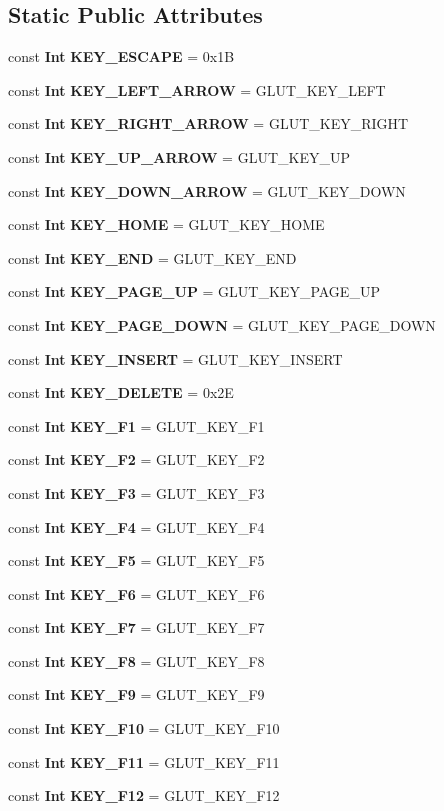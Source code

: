 \subsection*{Static Public Attributes}
\begin{CompactItemize}
\item 
const {\bf Int} {\bf KEY\_\-ESCAPE} = 0x1B
\item 
const {\bf Int} {\bf KEY\_\-LEFT\_\-ARROW} = GLUT\_\-KEY\_\-LEFT
\item 
const {\bf Int} {\bf KEY\_\-RIGHT\_\-ARROW} = GLUT\_\-KEY\_\-RIGHT
\item 
const {\bf Int} {\bf KEY\_\-UP\_\-ARROW} = GLUT\_\-KEY\_\-UP
\item 
const {\bf Int} {\bf KEY\_\-DOWN\_\-ARROW} = GLUT\_\-KEY\_\-DOWN
\item 
const {\bf Int} {\bf KEY\_\-HOME} = GLUT\_\-KEY\_\-HOME
\item 
const {\bf Int} {\bf KEY\_\-END} = GLUT\_\-KEY\_\-END
\item 
const {\bf Int} {\bf KEY\_\-PAGE\_\-UP} = GLUT\_\-KEY\_\-PAGE\_\-UP
\item 
const {\bf Int} {\bf KEY\_\-PAGE\_\-DOWN} = GLUT\_\-KEY\_\-PAGE\_\-DOWN
\item 
const {\bf Int} {\bf KEY\_\-INSERT} = GLUT\_\-KEY\_\-INSERT
\item 
const {\bf Int} {\bf KEY\_\-DELETE} = 0x2E
\item 
const {\bf Int} {\bf KEY\_\-F1} = GLUT\_\-KEY\_\-F1
\item 
const {\bf Int} {\bf KEY\_\-F2} = GLUT\_\-KEY\_\-F2
\item 
const {\bf Int} {\bf KEY\_\-F3} = GLUT\_\-KEY\_\-F3
\item 
const {\bf Int} {\bf KEY\_\-F4} = GLUT\_\-KEY\_\-F4
\item 
const {\bf Int} {\bf KEY\_\-F5} = GLUT\_\-KEY\_\-F5
\item 
const {\bf Int} {\bf KEY\_\-F6} = GLUT\_\-KEY\_\-F6
\item 
const {\bf Int} {\bf KEY\_\-F7} = GLUT\_\-KEY\_\-F7
\item 
const {\bf Int} {\bf KEY\_\-F8} = GLUT\_\-KEY\_\-F8
\item 
const {\bf Int} {\bf KEY\_\-F9} = GLUT\_\-KEY\_\-F9
\item 
const {\bf Int} {\bf KEY\_\-F10} = GLUT\_\-KEY\_\-F10
\item 
const {\bf Int} {\bf KEY\_\-F11} = GLUT\_\-KEY\_\-F11
\item 
const {\bf Int} {\bf KEY\_\-F12} = GLUT\_\-KEY\_\-F12

\end{CompactItemize}
